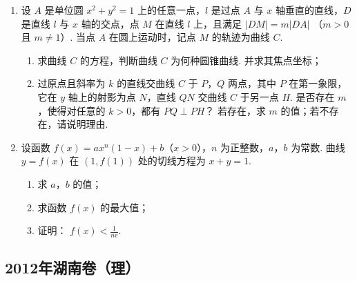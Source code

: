 \begin{description}
\begin{enumerate}[leftmargin=5pt]
        \item 设 \(A\) 是单位圆 \(x^{2} + y^{2} = 1\) 上的任意一点，\(l\) 是过点 \(A\) 与 \(x\) 轴垂直的直线，\(D\) 是直线 \(l\) 与 \(x\) 轴的交点，点 \(M\) 在直线 \(l\) 上，且满足 \(|DM| = m|DA|\) （\(m > 0\) 且 \(m \neq 1\)）. 当点 \(A\) 在圆上运动时，记点 \(M\) 的轨迹为曲线 \(C\).
\begin{enumerate}
\item 求曲线 \(C\) 的方程，判断曲线 \(C\) 为何种圆锥曲线. 并求其焦点坐标；
\item 过原点且斜率为 \(k\) 的直线交曲线 \(C\) 于 \(P\)，\(Q\) 两点，其中 \(P\) 在第一象限，它在 \(y\) 轴上的射影为点 \(N\)，直线 \(QN\) 交曲线 \(C\) 于另一点 \(H\). 是否存在 \(m\)，使得对任意的 \(k > 0\)，都有 \(PQ \perp PH\)？ 若存在，求 \(m\) 的值；若不存在，请说明理由.
\end{enumerate}

        \item 设函数 \( f(x) = ax^n (1 - x) + b \)（\(x > 0\)），\( n \) 为正整数，\(a\)，\(b\) 为常数. 曲线 \( y = f(x) \) 在 \( (1, f(1)) \) 处的切线方程为 \( x + y = 1 \).
\begin{enumerate}
\item 求 \(a\)，\(b\) 的值；
\item 求函数 \( f(x) \) 的最大值；
\item 证明： \( f(x) < \frac{1}{n{\mathrm{e}}} \).
\end{enumerate}

    \end{enumerate}

\end{description}


\subsection{2012年湖南卷（理）}\label{gk:2012年湖南卷（理）}

